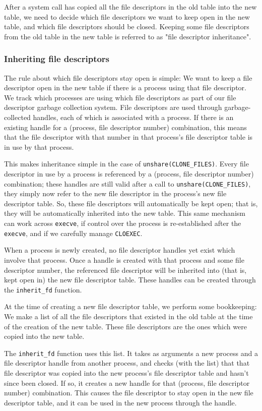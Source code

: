 \documentclass{acmart}
\begin{document}
After a system call has copied all the file descriptors in the old table into the new table,
we need to decide which file descriptors we want to keep open in the new table,
and which file descriptors should be closed.
Keeping some file descriptors from the old table in the new table
is referred to as "file descriptor inheritance".
\subsubsection{Inheriting file descriptors}
The rule about which file descriptors stay open is simple:
We want to keep a file descriptor open in the new table
if there is a process using that file descriptor.
We track which processes are using which file descriptors as part of our file descriptor garbage collection system.
File descriptors are used through garbage-collected handles,
each of which is associated with a process.
If there is an existing handle for a (process, file descriptor number) combination,
this means that the file descriptor with that number in that process's file descriptor table is in use by that process.

This makes inheritance simple in the case of \verb|unshare(CLONE_FILES)|.
Every file descriptor in use by a process
is referenced by a (process, file descriptor number) combination;
these handles are still valid after a call to \verb|unshare(CLONE_FILES)|,
they simply now refer to the new file descriptor in the process's new file descriptor table.
So, these file descriptors will automatically be kept open;
that is, they will be automatically inherited into the new table.
This same mechanism can work across \texttt{execve},
if control over the process is re-established after the \texttt{execve},
and if we carefully manage \texttt{CLOEXEC}.

When a process is newly created,
no file descriptor handles yet exist which involve that process.
Once a handle is created with that process and some file descriptor number,
the referenced file descriptor will be inherited into (that is, kept open in) the new file descriptor table.
These handles can be created through the \verb|inherit_fd| function.

At the time of creating a new file descriptor table,
we perform some bookkeeping:
We make a list of all the file descriptors that existed in the old table
at the time of the creation of the new table.
These file descriptors are the ones which were copied into the new table.

The \verb|inherit_fd| function uses this list.
It takes as arguments a new process and a file descriptor handle from another process,
and checks (with the list) that that file descriptor was copied into the new process's file descriptor table
and hasn't since been closed.
If so, it creates a new handle for that (process, file descriptor number) combination.
This causes the file descriptor to stay open in the new file descriptor table,
and it can be used in the new process through the handle.
\end{document}
